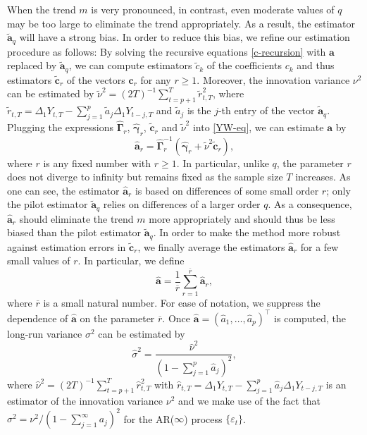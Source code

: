 When the trend $m$ is very pronounced, in contrast, even moderate values of $q$ may be too large to eliminate the trend appropriately. As a result, the estimator $\widetilde{\boldsymbol{a}}_q$ will have a strong bias. In order to reduce this bias, we refine our estimation procedure as follows: By solving the recursive equations \eqref{c-recursion} with $\boldsymbol{a}$ replaced by $\widetilde{\boldsymbol{a}}_q$, we can compute estimators $\widetilde{c}_k$ of the coefficients $c_k$ and thus estimators $\widetilde{\boldsymbol{c}}_r$ of the vectors $\boldsymbol{c}_r$ for any $r \ge 1$. Moreover, the innovation variance $\nu^2$ can be estimated by $\widetilde{\nu}^2 = (2T)^{-1} \sum_{t=p+1}^T \widetilde{r}_{t,T}^2$, where $\widetilde{r}_{t,T} = \Delta_1 Y_{t,T} - \sum_{j=1}^p \widetilde{a}_j \Delta_1 Y_{t-j,T}$ and $\widetilde{a}_j$ is the $j$-th entry of the vector $\widetilde{\boldsymbol{a}}_q$. Plugging the expressions $\widehat{\boldsymbol{\Gamma}}_r$, $\widehat{\boldsymbol{\gamma}}_r$, $\widetilde{\boldsymbol{c}}_r$ and $\widetilde{\nu}^2$ into \eqref{YW-eq}, we can estimate $\boldsymbol{a}$ by 
\begin{equation}\label{est-AR-SS} 
\widehat{\boldsymbol{a}}_r = \widehat{\boldsymbol{\Gamma}}_r^{-1} (\widehat{\boldsymbol{\gamma}}_r + \widetilde{\nu}^2 \widetilde{\boldsymbol{c}}_r),
\end{equation} 
where $r$ is any fixed number with $r \ge 1$. In particular, unlike $q$, the parameter $r$ does not diverge to infinity but remains fixed as the sample size $T$ increases. As one can see, the estimator $\widehat{\boldsymbol{a}}_r$ is based on differences of some small order $r$; only the pilot estimator $\widetilde{\boldsymbol{a}}_q$ relies on differences of a larger order $q$. As a consequence, $\widehat{\boldsymbol{a}}_r$ should eliminate the trend $m$ more appropriately and should thus be less biased than the pilot estimator $\widetilde{\boldsymbol{a}}_q$. In order to make the method more robust against estimation errors in $\widetilde{\boldsymbol{c}}_r$, we finally average the estimators $\widehat{\boldsymbol{a}}_r$ for a few small values of $r$. In particular, we define  
\begin{equation}\label{est-AR}
\widehat{\boldsymbol{a}} = \frac{1}{\overline{r}} \sum\limits_{r=1}^{\overline{r}} \widehat{\boldsymbol{a}}_r, 
\end{equation}
where $\overline{r}$ is a small natural number. For ease of notation, we suppress the dependence of $\widehat{\boldsymbol{a}}$ on the parameter $\overline{r}$. Once $\widehat{\boldsymbol{a}} =(\widehat{a}_1,\ldots,\widehat{a}_p)^\top$ is computed, the long-run variance $\sigma^2$ can be estimated by 
\begin{equation} \label{est-lrv}
\widehat{\sigma}^2 = \frac{\widehat{\nu}^2}{(1 - \sum_{j=1}^p \widehat{a}_j)^2}, 
\end{equation}
where $\widehat{\nu}^2 = (2T)^{-1} \sum_{t=p+1}^T \widehat{r}_{t,T}^2$ with $\widehat{r}_{t,T} = \Delta_1 Y_{t,T} - \sum_{j=1}^p \widehat{a}_j \Delta_1 Y_{t-j,T}$ is an estimator of the innovation variance $\nu^2$ and we make use of the fact that $\sigma^2 = \nu^2 / (1 - \sum_{j=1}^\infty a_j)^2$ for the AR($\infty$) process $\{\varepsilon_t\}$. 



